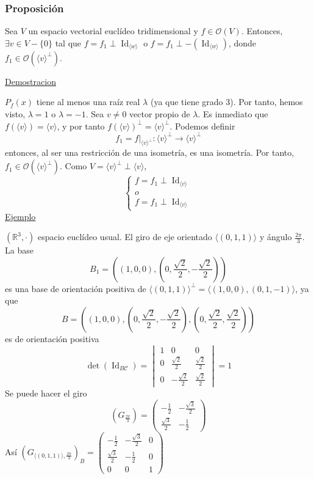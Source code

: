\documentclass[12pt, a4paper, ones, notitlepage, openany,titlepage]{article}
\begin{document}
\subsubsection{Proposición}
Sea $V$ un espacio vectorial euclídeo tridimensional y $f \in \mathcal{O}(V)$. Entonces, $\exists v \in V - \{0\}$ tal que $f = f_1 \perp \operatorname{Id}_{\langle w \rangle}$ o $f = f_1 \perp -(\operatorname{Id}_{\langle w \rangle})$, donde $f_1 \in \mathcal{O}(\langle v \rangle^\perp)$.

\noindent\underline{Demostracion}

$P_f(x)$ tiene al menos una raíz real $\lambda$ (ya que tiene grado $3$). Por tanto, hemos visto, $\lambda = 1$ o $\lambda = -1$. Sea $v \neq 0$ vector propio de $\lambda$. Es inmediato que $f(\langle v \rangle) = \langle v \rangle$, y por tanto $f(\langle v \rangle)^\perp = \langle v \rangle^\perp$. Podemos definir
$$
f_1 = f|_{\langle v \rangle^\perp} : \langle v \rangle^\perp \longrightarrow \langle v \rangle^\perp
$$
entonces, al ser una restricción de una isometría, es una isometría. Por tanto, $f_1 \in \mathcal{O}(\langle v \rangle^\perp)$. Como $V = \langle v \rangle^\perp \perp \langle v \rangle$,
$$\begin{cases}
	f = f_1 \perp \operatorname{Id}_{\langle v \rangle} \\
	o \\
	f = f_1 \perp \operatorname{Id}_{\langle v \rangle}
\end{cases}
$$
\noindent\underline{Ejemplo}

$(\mathbb{R}^3, \cdot)$ espacio euclídeo usual. El giro de eje orientado $\langle (0, 1, 1) \rangle$ y ángulo $\displaystyle \frac{2\pi}{3}$. La base 
$$
\displaystyle B_1 = \left(\left(1,0,0\right),\left(0, \frac{\sqrt{2}}{2},-\frac{\sqrt{2}}{2}\right)\right)
$$
es una base de orientación positiva de $\langle(0,1,1)\rangle^\perp = \langle (1,0,0),(0,1,-1)\rangle$, ya que 
$$
B = \left(\left(1,0,0\right),\left(0, \frac{\sqrt{2}}{2},-\frac{\sqrt{2}}{2}\right),\left(0, \frac{\sqrt{2}}{2},\frac{\sqrt{2}}{2}\right)\right)
$$
es de orientación positiva
$$
\operatorname{det}\left(\operatorname{Id}_{B\mathcal{C}}\right) = \begin{vmatrix}
	1 & 0 & 0 \\
	0 & \frac{\sqrt{2}}{2} & \frac{\sqrt{2}}{2} \\
	0 & -\frac{\sqrt{2}}{2} & \frac{\sqrt{2}}{2}
\end{vmatrix} = 1
$$
Se puede hacer el giro
$$
\left(G_{\frac{2\pi}{3}}\right) = \begin{pmatrix}
	-\frac{1}{2} & -\frac{\sqrt{3}}{2} \\
	\frac{\sqrt{3}}{2} & -\frac{1}{2}
\end{pmatrix}
$$
Así
$\left(G_{\langle (0,1,1) \rangle, \frac{2\pi}{3}}\right)_B = \begin{pmatrix}
	-\frac{1}{2} & -\frac{\sqrt{3}}{2} & 0 \\
	\frac{\sqrt{3}}{2} & -\frac{1}{2} & 0 \\
	0 & 0 & 1
\end{pmatrix}$
\end{document}
